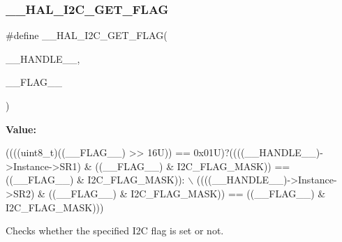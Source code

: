 \subsubsection{\texorpdfstring{\+\_\+\+\_\+\+H\+A\+L\+\_\+\+I2\+C\+\_\+\+G\+E\+T\+\_\+\+F\+L\+AG}{\_\_HAL\_I2C\_GET\_FLAG}}
{\footnotesize\ttfamily \#define \+\_\+\+\_\+\+H\+A\+L\+\_\+\+I2\+C\+\_\+\+G\+E\+T\+\_\+\+F\+L\+AG(\begin{DoxyParamCaption}\item[{}]{\+\_\+\+\_\+\+H\+A\+N\+D\+L\+E\+\_\+\+\_\+,  }\item[{}]{\+\_\+\+\_\+\+F\+L\+A\+G\+\_\+\+\_\+ }\end{DoxyParamCaption})}

{\bfseries Value\+:}
\begin{DoxyCode}
((((uint8\_t)((\_\_FLAG\_\_) >> 16U)) == 0x01U)?((((\_\_HANDLE\_\_)->Instance->SR1) & ((\_\_FLAG\_\_) & I2C\_FLAG\_MASK)) 
      == ((\_\_FLAG\_\_) & I2C\_FLAG\_MASK)): \(\backslash\)
                                                 ((((\_\_HANDLE\_\_)->Instance->SR2) & ((\_\_FLAG\_\_) & 
      I2C\_FLAG\_MASK)) == ((\_\_FLAG\_\_) & I2C\_FLAG\_MASK)))
\end{DoxyCode}


Checks whether the specified I2C flag is set or not. 


